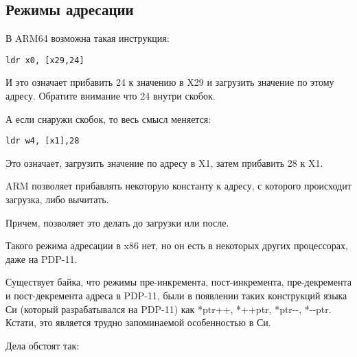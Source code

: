 ﻿\subsection{Режимы адресации}
\label{ARM_postindex_vs_preindex}
\myindex{\CLanguageElements!\PostIncrement}
\myindex{\CLanguageElements!\PostDecrement}
\myindex{\CLanguageElements!\PreIncrement}
\myindex{\CLanguageElements!\PreDecrement}

В ARM64 возможна такая инструкция:

\begin{lstlisting}[style=customasmARM]
ldr	x0, [x29,24]
\end{lstlisting}

И это означает прибавить 24 к значению в X29 и загрузить значение по этому адресу.
Обратите внимание что 24 внутри скобок.

А если снаружи скобок, то весь смысл меняется:

\begin{lstlisting}[style=customasmARM]
ldr	w4, [x1],28
\end{lstlisting}

Это означает, загрузить значение по адресу в X1, затем прибавить 28 к X1.

ARM позволяет прибавлять некоторую константу к адресу, с которого происходит загрузка, либо вычитать.

Причем, позволяет это делать до загрузки или после.

Такого режима адресации в x86 нет, но он есть в некоторых других процессорах, даже на PDP-11.

Существует байка, что режимы пре-инкремента, пост-инкремента, 
пре-декремента и пост-декремента адреса в PDP-11,
были  в появлении таких конструкций языка Си (который разрабатывался на PDP-11) как
*ptr++, *++ptr, *ptr-{}-, *-{}-ptr. 
Кстати, это является трудно запоминаемой особенностью в Си.

Дела обстоят так:

